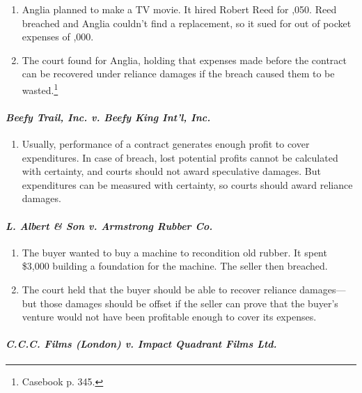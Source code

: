 \begin{enumerate}
    \item Anglia planned to make a TV movie. It hired Robert Reed for 
    ,050. Reed breached and Anglia couldn't find a replacement, 
    so it sued for out of pocket expenses of ,000.
    \item The court found for Anglia, holding that expenses made before the 
    contract can be recovered under reliance damages if the breach caused them 
    to be wasted.\footnote{Casebook p. 345.}
\end{enumerate}

\paragraph{\emph{Beefy Trail, Inc. v. Beefy King Int'l, Inc.}}

\begin{enumerate}
    \item Usually, performance of a contract generates enough profit to cover 
    expenditures. In case of breach, lost potential profits cannot be 
    calculated with certainty, and courts should not award speculative 
    damages. But expenditures can be measured with certainty, so courts should 
    award reliance damages.
\end{enumerate}

\paragraph{\emph{L. Albert \& Son v. Armstrong Rubber Co.}}

\begin{enumerate}
    \item The buyer wanted to buy a machine to recondition old rubber. It 
    spent \$3,000 building a foundation for the machine. The seller then 
    breached.
    \item The court held that the buyer should be able to recover reliance 
    damages---but those damages should be offset if the seller can prove that 
    the buyer's venture would not have been profitable enough to cover its 
    expenses.
\end{enumerate}

\paragraph{\emph{C.C.C. Films (London) v. Impact Quadrant Films Ltd.}}

